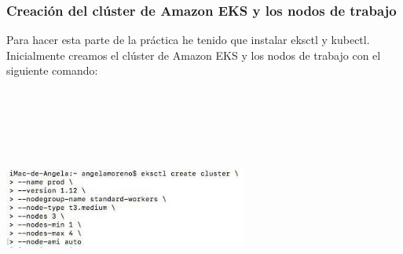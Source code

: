 \documentclass[english,runningheads,a4paper]{llncs}[2018/03/10]
\newenvironment{nscenter}
 {\parskip=0pt\par\nopagebreak\centering}
 {\par\noindent\ignorespacesafterend}
\begin{document}
\subsubsection*{Creación del clúster de Amazon EKS y los nodos de trabajo}
Para hacer esta parte de la práctica he tenido que instalar eksctl y kubectl. \\
Inicialmente creamos el clúster de Amazon EKS y los nodos de trabajo con el 
siguiente comando:
\newline
\begin{nscenter}
\includegraphics[width=8cm,height=8cm,keepaspectratio]{./Contenedores/AWS/22.jpg}
\end{nscenter}
\end{document}
